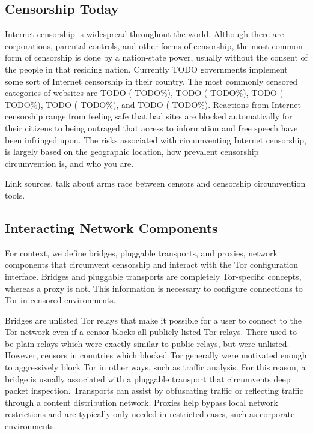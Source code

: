\documentclass{template}
\begin{document}
\subsection{Censorship Today} 
Internet censorship is widespread throughout the world. Although there are corporations, parental controls, and other forms of censorship, the most common form of censorship is done by a nation-state power, usually without the consent of the people in that residing nation. Currently {\color {red} TODO} governments implement some sort of Internet censorship in their country. The most commonly censored categories of websites are {\color {red} TODO} ({\color {red} TODO}\%), {\color {red} TODO} ({\color {red} TODO}\%), {\color {red} TODO} ({\color {red} TODO}\%), {\color {red} TODO} ({\color {red} TODO}\%), and {\color {red} TODO} ({\color {red} TODO}\%).  Reactions from Internet censorship range from feeling safe that bad sites are blocked automatically for their citizens to being outraged that access to information and free speech have been infringed upon. The risks associated with circumventing Internet censorship, is largely based on the geographic location, how prevalent censorship circumvention is, and who you are. 

{\color{red} Link sources, talk about arms race between censors and censorship circumvention tools.} 

\subsection{Interacting Network Components} 
For context, we define bridges, pluggable transports, and proxies, network components that 
circumvent censorship and interact with the Tor configuration interface. 
Bridges and pluggable transports are completely Tor-specific concepts, whereas a proxy is not.  
This information is necessary to configure connections to Tor in censored environments. 

Bridges are unlisted Tor relays that make it possible for a user to connect
to the Tor network even if a censor blocks all publicly listed Tor relays. There used 
to be plain relays which were exactly similar to public relays, but were unlisted. However, 
censors in countries which blocked Tor generally were motivated enough to aggressively
block Tor in other ways, such as traffic analysis. For this reason, a bridge is usually associated
with a pluggable transport that circumvents deep packet inspection. Transports can
assist by obfuscating traffic or reflecting traffic through a content distribution network. 
Proxies help bypass local network restrictions and are typically only
needed in restricted cases, such as corporate environments.
\end{document}
